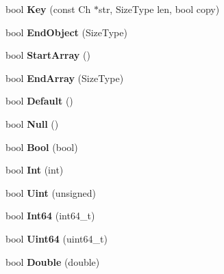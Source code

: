 \begin{DoxyCompactItemize}
bool {\bfseries Key} (const Ch $\ast$str, Size\+Type len, bool copy)
\item 
\mbox{\label{structBaseReaderHandler_a0406cee0af26bc3a0b7fb2414537b0ab}} 
bool {\bfseries End\+Object} (Size\+Type)
\item 
\mbox{\label{structBaseReaderHandler_a9dbb1143a250a904bb18a174553a3a00}} 
bool {\bfseries Start\+Array} ()
\item 
\mbox{\label{structBaseReaderHandler_ae9d60a8779b6a77a7f283d64961879fb}} 
bool {\bfseries End\+Array} (Size\+Type)
\item 
\mbox{\label{structBaseReaderHandler_a836437f6ccc37f08ff933f009b18a78c}} 
bool {\bfseries Default} ()
\item 
\mbox{\label{structBaseReaderHandler_ae2ebbde4628bf3659ddc5d18520935f5}} 
bool {\bfseries Null} ()
\item 
\mbox{\label{structBaseReaderHandler_aa1c3ce42dbb856b3349792dc9d963587}} 
bool {\bfseries Bool} (bool)
\item 
\mbox{\label{structBaseReaderHandler_a85e813aaf7189a2f87bd53953324fafc}} 
bool {\bfseries Int} (int)
\item 
\mbox{\label{structBaseReaderHandler_a0e683306cbb7b4e350a35c18c5246f2a}} 
bool {\bfseries Uint} (unsigned)
\item 
\mbox{\label{structBaseReaderHandler_a04011733ea584739c97ad5c6afa15a35}} 
bool {\bfseries Int64} (int64\+\_\+t)
\item 
\mbox{\label{structBaseReaderHandler_a351aa3cd81856a487c21022e9cc64d2b}} 
bool {\bfseries Uint64} (uint64\+\_\+t)
\item 
\mbox{\label{structBaseReaderHandler_a8156ea6ae5b8cd23a8b700e92a8af1eb}} 
bool {\bfseries Double} (double)
\item 
\mbox{\label{structBaseReaderHandler_a9ed0d83d5e6c8f5e4b32ca3735ff0bb7}} 

\end{DoxyCompactItemize}
